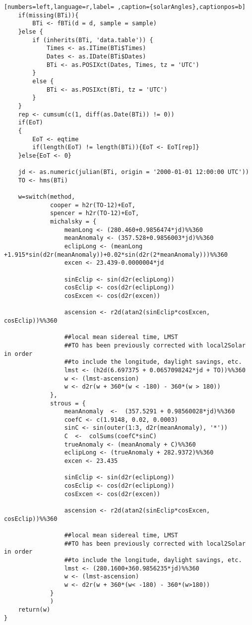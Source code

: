 \begin{lstlisting}[numbers=left,language=r,label= ,caption={solarAngles},captionpos=b]
    if(missing(BTi)){
        BTi <- fBTi(d = d, sample = sample)
    }else {
        if (inherits(BTi, 'data.table')) {
            Times <- as.ITime(BTi$Times)
            Dates <- as.IDate(BTi$Dates)
            BTi <- as.POSIXct(Dates, Times, tz = 'UTC')
        }
        else {
            BTi <- as.POSIXct(BTi, tz = 'UTC')
        }   
    }
    rep <- cumsum(c(1, diff(as.Date(BTi)) != 0))
    if(EoT)
    {
        EoT <- eqtime
        if(length(EoT) != length(BTi)){EoT <- EoT[rep]}
    }else{EoT <- 0}

    jd <- as.numeric(julian(BTi, origin = '2000-01-01 12:00:00 UTC'))
    TO <- hms(BTi)

    w=switch(method,
             cooper = h2r(TO-12)+EoT,
             spencer = h2r(TO-12)+EoT,
             michalsky = {
                 meanLong <- (280.460+0.9856474*jd)%%360
                 meanAnomaly <- (357.528+0.9856003*jd)%%360
                 eclipLong <- (meanLong +1.915*sin(d2r(meanAnomaly))+0.02*sin(d2r(2*meanAnomaly)))%%360
                 excen <- 23.439-0.0000004*jd

                 sinEclip <- sin(d2r(eclipLong))
                 cosEclip <- cos(d2r(eclipLong))
                 cosExcen <- cos(d2r(excen))

                 ascension <- r2d(atan2(sinEclip*cosExcen, cosEclip))%%360

                 ##local mean sidereal time, LMST
                 ##TO has been previously corrected with local2Solar in order
                 ##to include the longitude, daylight savings, etc.
                 lmst <- (h2d(6.697375 + 0.0657098242*jd + TO))%%360
                 w <- (lmst-ascension)
                 w <- d2r(w + 360*(w < -180) - 360*(w > 180))
             },
             strous = {
                 meanAnomaly  <-  (357.5291 + 0.98560028*jd)%%360
                 coefC <- c(1.9148, 0.02, 0.0003)
                 sinC <- sin(outer(1:3, d2r(meanAnomaly), '*'))
                 C  <-  colSums(coefC*sinC)
                 trueAnomaly <- (meanAnomaly + C)%%360
                 eclipLong <- (trueAnomaly + 282.9372)%%360
                 excen <- 23.435

                 sinEclip <- sin(d2r(eclipLong))
                 cosEclip <- cos(d2r(eclipLong))
                 cosExcen <- cos(d2r(excen))

                 ascension <- r2d(atan2(sinEclip*cosExcen, cosEclip))%%360

                 ##local mean sidereal time, LMST
                 ##TO has been previously corrected with local2Solar in order
                 ##to include the longitude, daylight savings, etc.
                 lmst <- (280.1600+360.9856235*jd)%%360
                 w <- (lmst-ascension)
                 w <- d2r(w + 360*(w< -180) - 360*(w>180))
             }
             )
    return(w)
}


\end{lstlisting}
